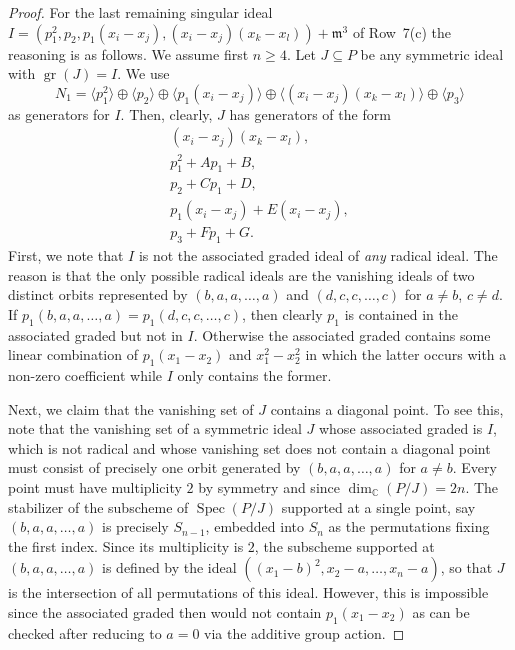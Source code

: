 \documentclass[11pt]{amsart}
\theoremstyle{definition}
\newcommand{\CC}{\mathbb{C}}
\newcommand{\mm}{\mathfrak{m}}
\DeclareMathOperator{\Spec}{Spec}
\DeclareMathOperator{\gr}{gr}
\begin{document}
\begin{proof}
\medskip
For the last remaining singular ideal $I = (p_1^2,p_2,p_1(x_i-x_j),(x_i-x_j)(x_k-x_l)) + \mm^3$ of Row~7(c) the reasoning is as follows. We assume first $n \geq 4$.
Let $J \subseteq P$ be any symmetric ideal with $\gr(J) = I$. We use
\[N_1 = \langle p_1^2 \rangle \oplus \langle p_2 \rangle \oplus \langle p_1(x_i-x_j) \rangle \oplus \langle (x_i-x_j)(x_k-x_l) \rangle \oplus \langle p_3 \rangle \]
as generators for $I$.
Then, clearly, $J$ has generators of the form 
\begin{align*}
    (x_i-x_j)(x_k-x_l), \\
    p_1^2 + A p_1 + B, \\
    p_2 + C p_1 + D, \\
    p_1(x_i-x_j) + E (x_i-x_j), \\
    p_3 + F p_1 + G.
\end{align*}
First, we note that $I$ is not the associated graded ideal of \emph{any} radical ideal. The reason is that the only possible radical ideals are the vanishing ideals of two distinct orbits represented by $(b,a,a,\ldots,a)$ and $(d,c,c,\ldots,c)$ for $a \neq b$, $c \neq d$. If $p_1(b,a,a,\ldots,a) = p_1(d,c,c,\ldots,c)$, then clearly $p_1$ is contained in the associated graded but not in $I$. Otherwise the associated graded contains some linear combination of $p_1(x_1-x_2)$ and $x_1^2 - x_2^2$ in which the latter occurs with a non-zero coefficient while $I$ only contains the former.

Next, we claim that the vanishing set of $J$ contains a diagonal point. To see this, note that the vanishing set of a symmetric ideal $J$ whose associated graded is $I$, which is not radical and whose vanishing set does not contain a diagonal point must consist of precisely one orbit generated by $(b,a,a,\ldots,a)$ for $a \neq b$. Every point must have multiplicity $2$ by symmetry and since $\dim_\CC(P/J) = 2n$. The stabilizer of the subscheme of $\Spec(P/J)$ supported at a single point, say $(b,a,a,\ldots,a)$ is precisely $S_{n-1}$, embedded into $S_n$ as the permutations fixing the first index. Since its multiplicity is $2$, the subscheme supported at $(b,a,a,\ldots,a)$ is defined by the ideal $((x_1-b)^2, x_2 - a, \ldots, x_n - a)$, so that $J$ is the intersection of all permutations of this ideal. However, this is impossible since the associated graded then would not contain $p_1(x_1-x_2)$ as can be checked after reducing to $a=0$ via the additive group action.


\end{proof}
\end{document}

